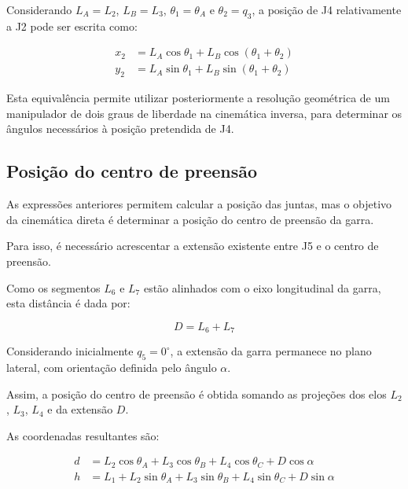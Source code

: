 Considerando $L_A=L_2$, $L_B=L_3$, $\theta_1=\theta_A$ e $\theta_2=q_3$, a posição de J4 relativamente a J2 pode ser escrita como:

\begin{equation}
    \begin{aligned}
        x_2 &= L_A\cos\theta_1+
        L_B\cos(\theta_1+\theta_2)\\
        y_2 &= L_A\sin\theta_1+
        L_B\sin(\theta_1+\theta_2)
    \end{aligned}
    \label{eq:2dof}
\end{equation}

Esta equivalência permite utilizar posteriormente a resolução geométrica de um manipulador de dois graus de liberdade na cinemática inversa, para determinar os ângulos necessários à posição pretendida de J4.

\subsection{Posição do centro de preensão}

As expressões anteriores permitem calcular a posição das juntas, mas o objetivo da cinemática direta é determinar a posição do centro de preensão da garra.

Para isso, é necessário acrescentar a extensão existente entre J5 e o centro de preensão.

Como os segmentos $L_6$ e $L_7$ estão alinhados com o eixo longitudinal da garra, esta distância é dada por:

\begin{equation}
    D=L_6+L_7
    \label{eq:distancia_garra}
\end{equation}

Considerando inicialmente $q_5=0^\circ$, a extensão da garra permanece no plano lateral, com orientação definida pelo ângulo $\alpha$.

Assim, a posição do centro de preensão é obtida somando as projeções dos elos $L_2$, $L_3$, $L_4$ e da extensão $D$.

As coordenadas resultantes são:

\begin{align}
    d &= L_2\cos\theta_A+
    L_3\cos\theta_B+
    L_4\cos\theta_C+
    D\cos\alpha
    \label{eq:d}\\
    h &= L_1+
    L_2\sin\theta_A+
    L_3\sin\theta_B+
    L_4\sin\theta_C+
    D\sin\alpha
    \label{eq:h}
\end{align}

